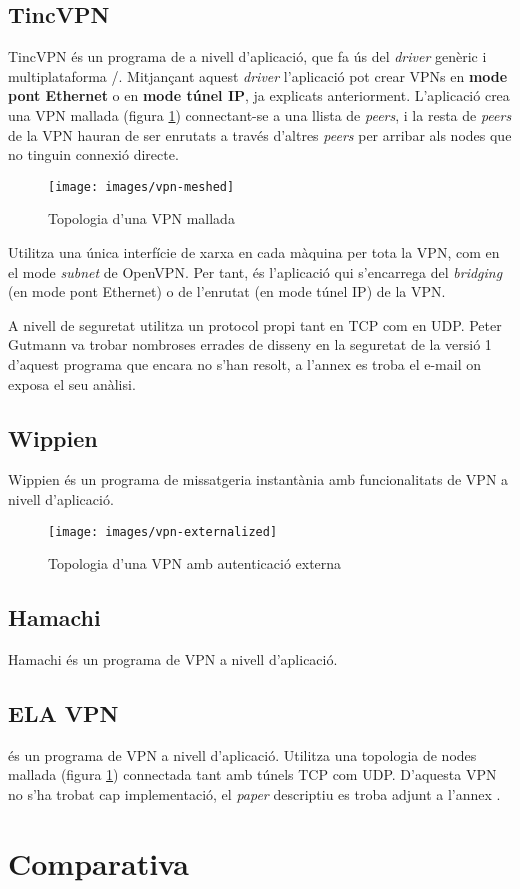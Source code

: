 \clearpage%
\subsection{TincVPN}
TincVPN és un programa de  a nivell d'aplicació, que fa ús del \emph{driver} genèric i multiplataforma /. Mitjançant aquest \emph{driver} l'aplicació pot crear VPNs en \textbf{mode pont Ethernet} o en \textbf{mode túnel IP}, ja explicats anteriorment. L'aplicació crea una VPN mallada (figura \ref{F:vpn-meshed}) connectant-se a una llista de \emph{peers}, i la resta de \emph{peers} de la VPN hauran de ser enrutats a través d'altres \emph{peers} per arribar als nodes que no tinguin connexió directe.
\begin{figure}[htb]
\centering
\texttt{[image: images/vpn-meshed]}
\caption{Topologia d'una VPN mallada}
\label{F:vpn-meshed}
\end{figure}

Utilitza una única interfície de xarxa en cada màquina per tota la VPN, com en el mode \emph{subnet} de OpenVPN. Per tant, és l'aplicació qui s'encarrega del \emph{bridging} (en mode pont Ethernet) o de l'enrutat (en mode túnel IP) de la VPN.

A nivell de seguretat utilitza un protocol propi tant en TCP com en UDP. Peter Gutmann va trobar nombroses errades de disseny en la seguretat de la versió 1 d'aquest programa que encara no s'han resolt, a l'annex  es troba el e-mail on exposa el seu anàlisi.

\subsection{Wippien}
Wippien és un programa de missatgeria instantània amb funcionalitats de VPN a nivell d'aplicació.
\begin{figure}[htb]
\centering
\texttt{[image: images/vpn-externalized]}
\caption{Topologia d'una VPN amb autenticació externa}
\label{F:vpn-externalized}
\end{figure}

\subsection{Hamachi}
Hamachi és un programa de VPN a nivell d'aplicació.

\subsection{ELA VPN}
 és un programa de VPN a nivell d'aplicació.
Utilitza una topologia de nodes mallada (figura \ref{F:vpn-meshed}) connectada tant amb túnels TCP com UDP.
D'aquesta VPN no s'ha trobat cap implementació, el \emph{paper} descriptiu es troba adjunt a l'annex .
\section{Comparativa}
